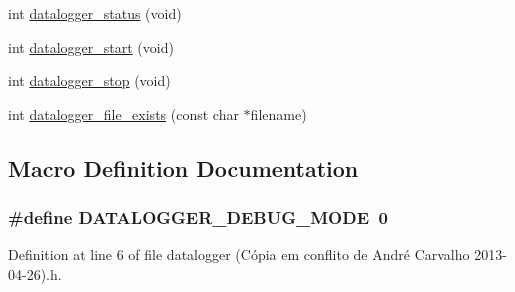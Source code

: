 \begin{DoxyCompactItemize}
\item 
int \hyperlink{datalogger_01_07C_xC3_xB3pia_01em_01conflito_01de_01Andr_xC3_xA9_01Carvalho_012013-04-26_08_8h_a46fd1290d9ee97d5fc7171e1e0dcb0aa}{datalogger\-\_\-status} (void)
\item 
int \hyperlink{datalogger_01_07C_xC3_xB3pia_01em_01conflito_01de_01Andr_xC3_xA9_01Carvalho_012013-04-26_08_8h_a1f254ef380d595d6605c10811fd0dee6}{datalogger\-\_\-start} (void)
\item 
int \hyperlink{datalogger_01_07C_xC3_xB3pia_01em_01conflito_01de_01Andr_xC3_xA9_01Carvalho_012013-04-26_08_8h_aae2ffbc6cbf8f1cfecceb42c5139530a}{datalogger\-\_\-stop} (void)
\item 
int \hyperlink{datalogger_01_07C_xC3_xB3pia_01em_01conflito_01de_01Andr_xC3_xA9_01Carvalho_012013-04-26_08_8h_a29bc3190cba1f225ad3b2eed899a6762}{datalogger\-\_\-file\-\_\-exists} (const char $\ast$filename)
\end{DoxyCompactItemize}


\subsection{Macro Definition Documentation}
\hypertarget{datalogger_01_07C_xC3_xB3pia_01em_01conflito_01de_01Andr_xC3_xA9_01Carvalho_012013-04-26_08_8h_ae7698fd72f0fc0920eba24d963a25d5a}{
\subsubsection[{D\-A\-T\-A\-L\-O\-G\-G\-E\-R\-\_\-\-D\-E\-B\-U\-G\-\_\-\-M\-O\-D\-E}]{\setlength{\rightskip}{0pt plus 5cm}\#define D\-A\-T\-A\-L\-O\-G\-G\-E\-R\-\_\-\-D\-E\-B\-U\-G\-\_\-\-M\-O\-D\-E~0}}\label{datalogger_01_07C_xC3_xB3pia_01em_01conflito_01de_01Andr_xC3_xA9_01Carvalho_012013-04-26_08_8h_ae7698fd72f0fc0920eba24d963a25d5a}


Definition at line 6 of file datalogger (\-Cópia em conflito de André Carvalho 2013-\/04-\/26).\-h.


